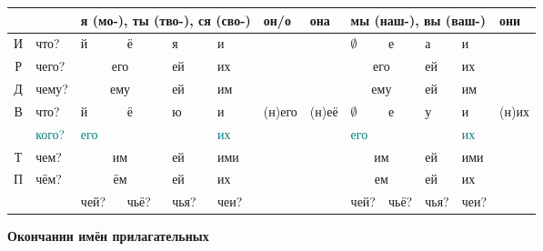 \documentclass[a4paper, landscape, 11pt]{article}
\newcommand{\an}[1]{\textcolor{teal}{#1}} %
\begin{document}
\begin{tabularx}{\textwidth}{|c|X|X|X|X|X|X|X|X|X|X|X|X|}
	\hline
	\strut & \strut     & \multicolumn{4}{l|}{я (мо-), ты (тво-), ся (сво-)} & он/о   & она    & \multicolumn{4}{l|}{мы (наш-), вы (ваш-)}   & они    \\ \hline
	  И    & что?       & й        & ё             & я      & и              & \strut & \strut & $\emptyset$ & е          & а      & и       & \strut \\ %
	  Р    & чего?      & \multicolumn{2}{c|}{его} & ей     & их             & \strut & \strut & \multicolumn{2}{c|}{его} & ей     & их      & \strut \\ %
	  Д    & чему?      & \multicolumn{2}{c|}{ему} & ей     & им             & \strut & \strut & \multicolumn{2}{c|}{ему} & ей     & им      & \strut \\ %
	  В    & что?       & й        & ё             & ю      & и              & (н)его & (н)её  & $\emptyset$ & е          & у      & и       & (н)их  \\
	\strut & \an{кого?} & \an{его} & \strut        & \strut & \an{их}        & \strut & \strut & \an{его}    & \strut     & \strut & \an{их} & \strut \\ %
	  Т    & чем?       & \multicolumn{2}{c|}{им}  & ей     & ими            & \strut & \strut & \multicolumn{2}{c|}{им}  & ей     & ими     & \strut \\ %
	  П    & чём?       & \multicolumn{2}{c|}{ём}  & ей     & их             & \strut & \strut & \multicolumn{2}{c|}{ем}  & ей     & их      & \strut \\ \hline
	\strut & \strut     & чей?     & чьё?          & чья?   & чеи?           & \strut & \strut & чей?        & чьё?       & чья?   & чеи?    & \strut \\ \hline
\end{tabularx}

\vfill\strut

\newpage

\begin{center}
	\Huge\bfseries Окончании имён прилагательных
\end{center}
\end{document}
